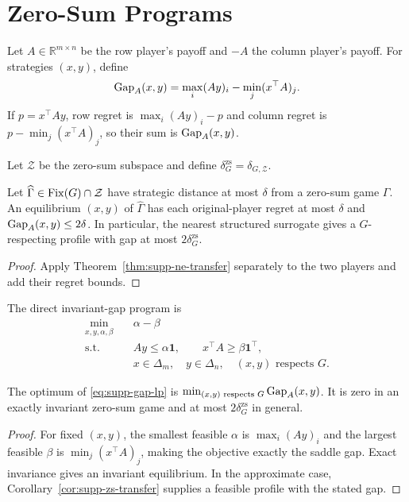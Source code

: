 \section{Zero-Sum Programs}

Let $A\in\mathbb R^{m\times n}$ be the row player's payoff and $-A$ the column player's payoff.  For strategies $(x,y)$, define
\[
\operatorname{Gap}_A(x,y)=\max_i(Ay)_i-\min_j(x^\top A)_j.
\]
If $p=x^\top Ay$, row regret is $\max_i(Ay)_i-p$ and column regret is $p-\min_j(x^\top A)_j$, so their sum is $\operatorname{Gap}_A(x,y)$.

Let $\mathcal Z$ be the zero-sum subspace and define
$\delta^{\mathrm{zs}}_G=\delta_{G,\mathcal Z}$.

\begin{corollary}
\label{cor:supp-zs-transfer}
Let $\widehat\Gamma\in\operatorname{Fix}(G)\cap\mathcal Z$ have strategic distance at most $\delta$ from a zero-sum game $\Gamma$.  An equilibrium $(x,y)$ of $\widehat\Gamma$ has each original-player regret at most $\delta$ and $\operatorname{Gap}_A(x,y)\le2\delta$.  In particular, the nearest structured surrogate gives a $G$-respecting profile with gap at most $2\delta_G^{\mathrm{zs}}$.
\end{corollary}
\begin{proof}
Apply Theorem~\ref{thm:supp-ne-transfer} separately to the two players and add their regret bounds.
\end{proof}

The direct invariant-gap program is
\begin{align}
\min_{x,y,\alpha,\beta}\quad&\alpha-\beta\label{eq:supp-gap-lp}\\
\text{s.t.}\quad
&Ay\le\alpha\mathbf1,\qquad x^\top A\ge\beta\mathbf1^\top,\nonumber\\
&x\in\Delta_m,\quad y\in\Delta_n,\quad (x,y)\text{ respects }G.\nonumber
\end{align}

\begin{proposition}
\label{prop:supp-gap-lp}
The optimum of \eqref{eq:supp-gap-lp} is $\min_{(x,y)\text{ respects }G}\operatorname{Gap}_A(x,y)$.  It is zero in an exactly invariant zero-sum game and at most $2\delta_G^{\mathrm{zs}}$ in general.
\end{proposition}
\begin{proof}
For fixed $(x,y)$, the smallest feasible $\alpha$ is $\max_i(Ay)_i$ and the largest feasible $\beta$ is $\min_j(x^\top A)_j$, making the objective exactly the saddle gap.  Exact invariance gives an invariant equilibrium.  In the approximate case, Corollary~\ref{cor:supp-zs-transfer} supplies a feasible profile with the stated gap.
\end{proof}

